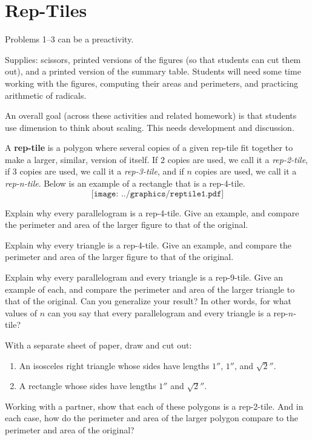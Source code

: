 \newpage
\section{Rep-Tiles}
\begin{teachingnote}
Problems 1--3 can be a preactivity.  

Supplies: scissors, printed versions of the figures (so that students can cut them out), and a printed version of the summary table.   Students will need some time working with the figures, computing their areas and perimeters, and practicing arithmetic of radicals.   

An overall goal (across these activities and related homework) is that students use dimension to think about scaling. This needs development and discussion.  
\end{teachingnote}

A \textbf{rep-tile} is a polygon where several copies of
a given rep-tile fit together to make a larger, similar, version of
itself. If $2$ copies are used, we call it a \textit{rep-2-tile}, if
$3$ copies are used, we call it a \textit{rep-3-tile}, and if $n$ copies
are used, we call it a \textit{rep-n-tile}.  Below is an example of a rectangle 
that is a rep-4-tile.
\[ 
\texttt{[image: ../graphics/reptile1.pdf]}
\]
\begin{prob}
Explain why every parallelogram is a rep-4-tile. Give an example, and compare the perimeter and area of the larger figure to that of the original.
\end{prob}

\begin{prob}
Explain why every triangle is a rep-4-tile. Give an example, and compare the perimeter and area of the larger figure to that of the
original.
\end{prob}

\begin{prob}
Explain why every parallelogram and every triangle is a rep-9-tile. Give an example of each, and compare the perimeter and area of the larger triangle to that of the original. Can you generalize your result?  In other words, for what values of $n$ can you say that every parallelogram and every triangle is a rep-$n$-tile?  
\end{prob}

\begin{prob}
With a separate sheet of paper, draw and cut out:
\begin{enumerate}
\item An isosceles right triangle whose sides have lengths $1''$, $1''$, and $\sqrt{2}''$.
\item A rectangle whose sides have lengths $1''$ and $\sqrt{2}''$.
\end{enumerate}
Working with a partner, show that each of these polygons is a rep-2-tile.  And in each case,
how do the perimeter and area of the larger polygon compare to the perimeter and area of the original?
\end{prob}

